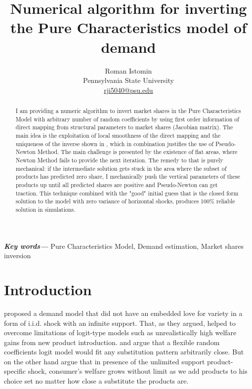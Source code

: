 \documentclass[12pt,letterpaper]{article}
\author{Roman Istomin \\ Pennsylvania State University \\  \href{mailto:rji5040@psu.edu}{rji5040@psu.edu} }
\title{Numerical algorithm for inverting the Pure Characteristics model of demand}
\providecommand{\keywords}[1]{\textbf{\textit{Key words---}} #1}
\begin{document}
	\maketitle
	
	\begin{abstract}
	I am providing a numeric algorithm to invert market shares in the Pure Characteristics Model with arbitrary number of random coefficients by using first order information of direct mapping from structural parameters to market shares (Jacobian matrix). The main idea is the exploitation of local smoothness of the direct mapping and the uniqueness of the inverse shown in \cite{berry2007pure}, which in combination justifies the use of Pseudo-Newton Method. The main challenge is presented by the existence of flat areas, where Newton Method fails to provide the next iteration. The remedy to that is purely mechanical: if the intermediate solution gets stuck in the area where the subset of products has predicted zero share, I mechanically push the vertical parameters of these products up until all predicted shares are positive and Pseudo-Newton can get traction.
	This technique combined with the "good" initial guess that is the closed form solution to the model with zero variance of horizontal shocks, produces 100\% reliable solution in simulations.
	\end{abstract}
	
	\keywords{Pure Characteristics Model, Demand estimation, Market shares inversion}
	
	\section{Introduction}
	\cite{berry2007pure} proposed a demand model that did not have an embedded love for variety in a form of i.i.d. shock with an infinite support. That, as they argued, helped to overcome limitations of logit-type models such as unrealistically high welfare gains from new product introduction. \cite{mcfadden1978modeling} and \cite{nevo2000practitioner} argue that a flexible random coefficients logit model would fit any substitution pattern arbitrarily close. But on the other hand \cite{berry2007pure} argue that in presence of the unlimited support product-specific shock, consumer's welfare grows without limit as we add products to his choice set no matter how close a substitute the products are. 
	
\end{document}
